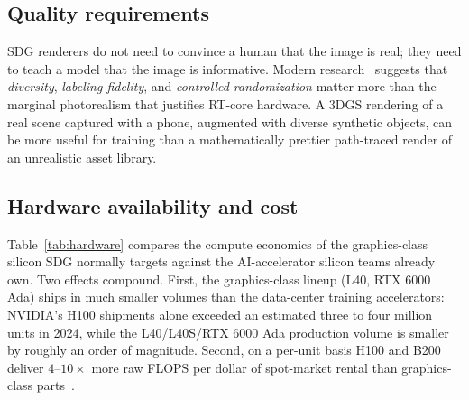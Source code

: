 \documentclass[10pt,journal]{IEEEtran}
\begin{document}
\subsection{Quality requirements}

SDG renderers do not need to convince a human that the image is real;
they need to teach a model that the image is informative. Modern
research~\cite{tobin2017domain,nvidia2024cosmos} suggests that
\emph{diversity}, \emph{labeling fidelity}, and \emph{controlled
randomization} matter more than the marginal photorealism that justifies
RT-core hardware. A 3DGS rendering of a real scene captured with a
phone, augmented with diverse synthetic objects, can be more useful for
training than a mathematically prettier path-traced render of an
unrealistic asset library.

\subsection{Hardware availability and cost}

Table~\ref{tab:hardware} compares the compute economics of the
graphics-class silicon SDG normally targets against the AI-accelerator
silicon teams already own. Two effects compound. First, the
graphics-class lineup (L40, RTX 6000 Ada) ships in much smaller
volumes than the data-center training accelerators: NVIDIA's H100
shipments alone exceeded an estimated three to four million units in
2024, while the L40\slash L40S\slash RTX 6000 Ada production volume is
smaller by roughly an order of magnitude. Second, on a per-unit basis
H100 and B200 deliver $4$--$10{\times}$ more raw FLOPS per dollar of
spot-market rental than graphics-class
parts~\cite{nvidia-hopper-h100,nvidia-blackwell-b200}.
\end{document}

